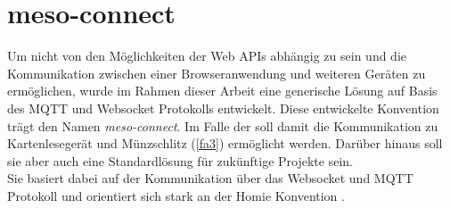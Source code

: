 \section{meso-connect}
\label{sec:meso-connect}

Um nicht von den Möglichkeiten der Web APIs abhängig zu sein und die Kommunikation
zwischen einer Browseranwendung und weiteren Geräten zu ermöglichen, wurde im Rahmen dieser
Arbeit eine generische Lösung auf Basis des MQTT und Websocket Protokolls entwickelt.
Diese entwickelte Konvention trägt den Namen \emph{meso-connect}.
Im Falle der \shst{} soll damit die Kommunikation zu Kartenlesegerät und Münzschlitz (\ref{fa3})
ermöglicht werden. Darüber hinaus soll sie aber auch eine Standardlösung für zukünftige 
Projekte sein. \\
Sie basiert dabei auf der Kommunikation über das Websocket und MQTT Protokoll und orientiert sich stark an 
der Homie Konvention \cite{homie}.



